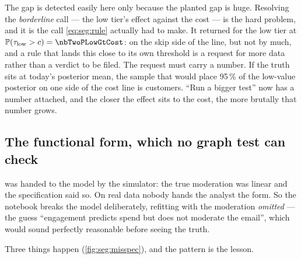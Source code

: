 The gap is detected easily here only because the planted gap is huge. Resolving the \emph{borderline}
call --- the low tier's effect against the \eur{\nbTwoCost} cost --- is the hard problem, and it is
the call \cref{eq:seg:rule} actually had to make. It returned \nbTwoActionLow{} for the low tier at
$\Prob(\tau_{\mathrm{low}} > c) = \nbTwoPLowGtCost$: on the skip side of the line, but not by much,
and a rule that lands this close to its own threshold is a request for more data rather than a
verdict to be filed. The request must carry a number. If the truth sits at today's posterior mean,
the sample that would place 95\,\% of the low-value posterior on one side of the cost line is
\nbTwoNFollowup{} customers. ``Run a bigger test'' now has a number attached, and the closer the
effect sits to the cost, the more brutally that number grows.

\subsection*{The functional form, which no graph test can check}

 was handed to the model by the simulator: the true moderation was linear and the
specification said so. On real data nobody hands the analyst the form. So the notebook breaks the
model deliberately, refitting with the  moderation \emph{omitted} --- the
guess ``engagement predicts spend but does not moderate the email'', which would sound perfectly
reasonable before seeing the truth.



Three things happen (\cref{fig:seg:misspec}), and the pattern is the lesson.

